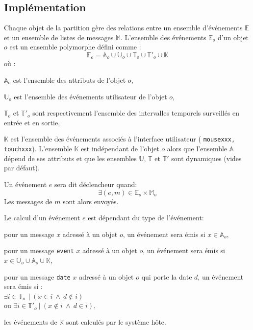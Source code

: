\documentclass{article}
\newcommand{\OSC}[1]	{{\fontsize{9pt}{9pt} \selectfont\texttt{#1}}}
\let\olditemize\itemize
\let\oldenditemize\enditemize
\renewenvironment{itemize} 	{\olditemize \renewcommand{\labelitemi}{$\bullet$} \setlength{\itemsep}{0mm}}{\oldenditemize}
\begin{document}
\subsection{Implémentation}

Chaque objet de la partition gère des relations entre un ensemble d'événements $\mathbb{E}$ et un ensemble de listes de messages $\mathbb{M}$. L'ensemble des événements $\mathbb{E}_o$ d'un objet $o$ est un ensemble polymorphe défini comme : 
\[
	\mathbb{E}_o = \mathbb{A}_o \cup \mathbb{U}_o \cup \mathbb{T}_o \cup \mathbb{T'}_o \cup \mathbb{K}  
\] 
où :
\begin{itemize}
\item[-] $\mathbb{A}_o$ est l'ensemble des attributs de l'objet $o$, 
\item[-] $\mathbb{U}_o$ est l'ensemble des événements utilisateur de l'objet $o$, 
\item[-] $\mathbb{T}_o$ et $\mathbb{T'}_o$ sont respectivement l'ensemble des intervalles temporels surveillés en entrée et en sortie,
\item[-] $\mathbb{K}$ est l'ensemble des événements associés à l'interface utilisateur (\OSC{mousexxx, touchxxx}).
\end{itemize}
L'ensemble $\mathbb{K}$ est indépendant de l'objet $o$ alors que l'ensemble $\mathbb{A}$ dépend de ses attributs et que les ensembles $\mathbb{U}$, $\mathbb{T}$ et $\mathbb{T'}$ sont dynamiques (vides par défaut).

Un événement $e$ sera dit déclencheur quand:
\[
	\exists (e, m) \in \mathbb{E}_o \times \mathbb{M}_o  
\] 
Les messages de $m$ sont alors envoyés.

Le calcul d'un événement $e$ est dépendant du type de l'événement:
\begin{itemize}
\item[-] pour un message $x$ adressé à un objet $o$, un événement sera émis si $x \in \mathbb{A}_o$, 
\item[-] pour un message \OSC{event} $x$ adressé à un objet $o$, un événement sera émis si $x \in \mathbb{U}_o \cup \mathbb{A}_o \cup  \mathbb{K}$,
\item[-] pour un message \OSC{date} $x$ adressé à un objet $o$ qui porte la date $d$, un événement sera émis si :\\ 
\hspace*{3.5mm} $\exists i \in \mathbb{T}_o\ \ |\ (x \in i\ \land\ d \not\in i)$ \\
ou $\exists i \in \mathbb{T'}_o\ |\ (x \not \in i\ \land\ d \in i)$,
\item[-] les événements de $\mathbb{K}$ sont calculés par le système hôte.
\end{itemize}
\end{document}
